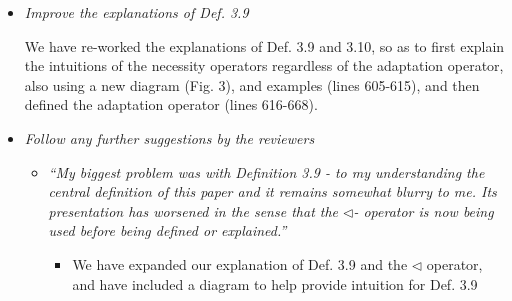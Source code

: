 \documentclass[11pt]{amsart}
\begin{document}
\begin{itemize}
\item
\emph{Improve the explanations of Def. 3.9}

We have re-worked the explanations of Def. 3.9  and 3.10, so as to first explain the intuitions of the necessity operators regardless of the adaptation operator, also using a new  diagram (Fig. 3), and examples (lines  605-615), and then defined the adaptation operator (lines 616-668).

\item
\emph{Follow any further suggestions by the reviewers}
\begin{itemize}
\item
\emph{``My biggest problem was with Definition 3.9 - to my understanding the central definition of this paper and it remains somewhat blurry to me. Its presentation has worsened in the sense that the $\triangleleft$- operator is now being used before being defined or explained.''}
\begin{itemize}
\item
We have expanded our explanation of Def. 3.9 and the $\triangleleft$ operator, and have included a diagram to help provide intuition for Def. 3.9
\end{itemize}
\end{itemize}
\end{itemize}




 
\end{document}
